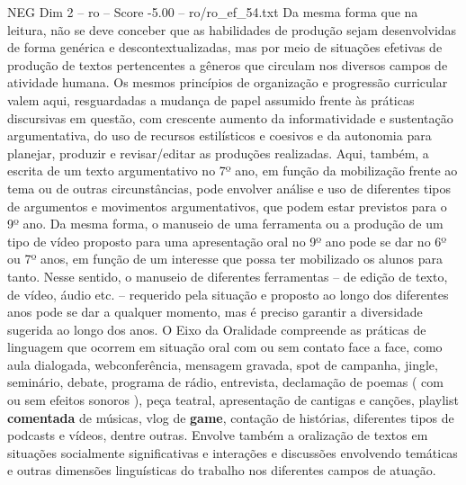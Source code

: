 \begin{textsample}{NEG Dim 2 – ro – Score -5.00 – ro/ro\_ef\_54.txt}  \label{ex:f2_neg_104}
Da mesma forma que na leitura, não se deve conceber que as habilidades de produção sejam desenvolvidas de forma genérica e descontextualizadas, mas por meio de situações efetivas de produção de textos pertencentes a gêneros que circulam nos diversos campos de atividade humana.
Os mesmos princípios de organização e progressão curricular valem aqui, resguardadas a mudança de papel assumido frente às práticas discursivas em questão, com crescente aumento da informatividade e sustentação argumentativa, do uso de recursos estilísticos e coesivos e da autonomia para planejar, produzir e revisar/editar as produções realizadas.
Aqui, também, a escrita de um texto argumentativo no 7º ano, em função da mobilização frente ao tema ou de outras circunstâncias, pode envolver análise e uso de diferentes tipos de argumentos e movimentos argumentativos, que podem estar previstos para o 9º ano.
Da mesma forma, o manuseio de uma ferramenta ou a produção de um tipo de vídeo proposto para uma apresentação oral no 9º ano pode se dar no 6º ou 7º anos, em função de um interesse que possa ter mobilizado os alunos para tanto.
Nesse sentido, o manuseio de diferentes ferramentas – de edição de texto, de vídeo, áudio etc. – requerido pela situação e proposto ao longo dos diferentes anos pode se dar a qualquer momento, mas é preciso garantir a diversidade sugerida ao longo dos anos.
O Eixo da Oralidade compreende as práticas de linguagem que ocorrem em situação oral com ou sem contato face a face, como aula dialogada, webconferência, mensagem gravada, spot de campanha, jingle, seminário, debate, programa de rádio, entrevista, declamação de poemas ( com ou sem efeitos sonoros ), peça teatral, apresentação de cantigas e canções, playlist \textbf{comentada} de músicas, vlog de \textbf{game}, contação de histórias, diferentes tipos de podcasts e vídeos, dentre outras.
Envolve também a oralização de textos em situações socialmente significativas e interações e discussões envolvendo temáticas e outras dimensões linguísticas do trabalho nos diferentes campos de atuação.

\end{textsample}
